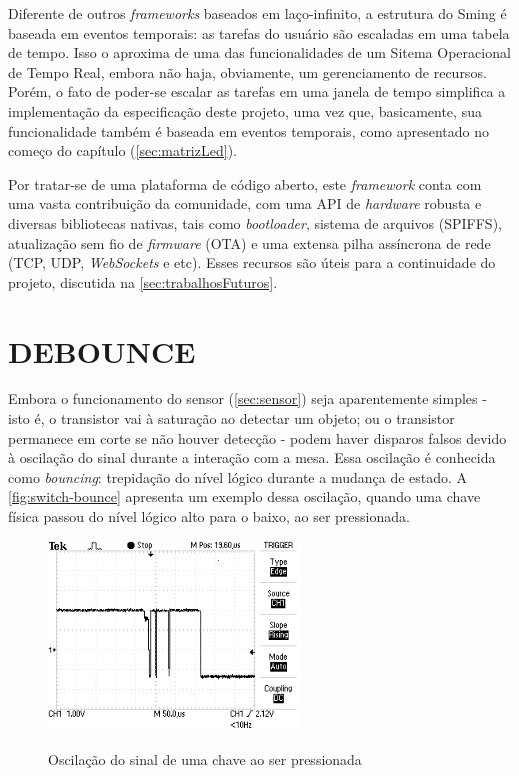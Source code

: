 Diferente de outros \emph{frameworks} baseados em laço-infinito, a estrutura do Sming é baseada em eventos temporais: as tarefas do usuário são escaladas em uma tabela de tempo. Isso o aproxima de uma das funcionalidades de um Sitema Operacional de Tempo Real, embora não haja, obviamente, um gerenciamento de recursos. Porém, o fato de poder-se escalar as tarefas em uma janela de tempo simplifica a implementação da especificação deste projeto, uma vez que, basicamente, sua funcionalidade também é baseada em eventos temporais, como apresentado no começo do capítulo (\autoref{sec:matrizLed}).

Por tratar-se de uma plataforma de código aberto, este \emph{framework} conta com uma vasta contribuição da comunidade, com uma API de \emph{hardware} robusta e diversas bibliotecas nativas, tais como \emph{bootloader}, sistema de arquivos (SPIFFS), atualização sem fio de \emph{firmware} (OTA) e uma extensa pilha assíncrona de rede (TCP, UDP, \emph{WebSockets} e etc). Esses recursos são úteis para a continuidade do projeto, discutida na \autoref{sec:trabalhosFuturos}.



\section{DEBOUNCE}
\label{sec:debounce}

Embora o funcionamento do sensor (\autoref{sec:sensor}) seja aparentemente simples - isto é, o transistor vai à saturação ao detectar um objeto; ou o transistor permanece em corte se não houver detecção - podem haver disparos falsos devido à oscilação do sinal durante a interação com a mesa. Essa oscilação é conhecida como \emph{bouncing}: trepidação do nível lógico durante a mudança de estado. A \autoref{fig:switch-bounce} apresenta um exemplo dessa oscilação, quando uma chave física passou do nível lógico alto para o baixo, ao ser pressionada.

\begin{figure}[H]
    \centering
    \caption{Oscilação do sinal de uma chave ao ser pressionada}
    \includegraphics[width=0.6\textwidth]{./dados/figuras/bounce}
    \label{fig:switch-bounce}
\end{figure}

